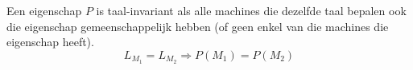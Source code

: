   Een eigenschap $P$ is taal-invariant als alle machines die dezelfde taal bepalen ook die eigenschap gemeenschappelijk hebben (of geen enkel van die machines die eigenschap heeft).
  \begin{equation*}
  L_{M_1} = L_{M_2} \Rightarrow P(M_1) = P(M_2)
  \end{equation*}